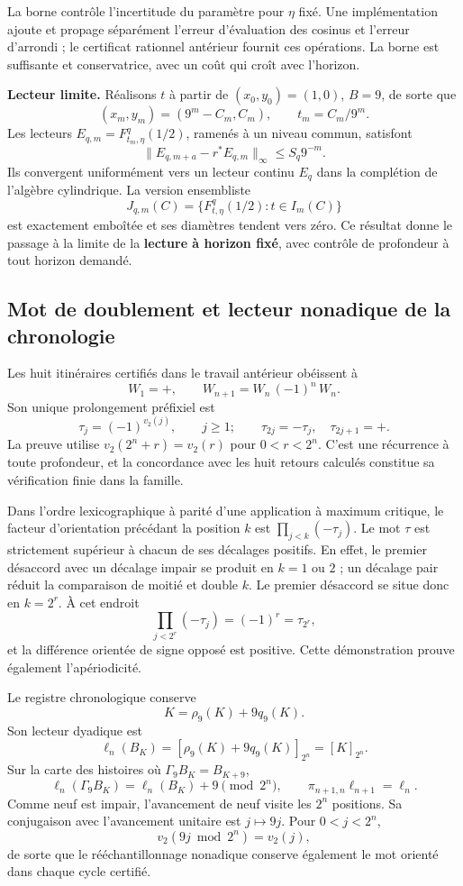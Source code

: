 La borne contrôle l’incertitude du paramètre pour \(\eta\) fixé. Une implémentation ajoute et propage séparément l’erreur d’évaluation des cosinus et l’erreur d’arrondi ; le certificat rationnel antérieur fournit ces opérations. La borne est suffisante et conservatrice, avec un coût qui croît avec l’horizon.

\textbf{Lecteur limite.} Réalisons \(t\) à partir de \((x_0,y_0)=(1,0)\), \(B=9\), de sorte que
\[
(x_m,y_m)=(9^m-C_m,C_m),\qquad t_m=C_m/9^m.
\]
Les lecteurs \(E_{q,m}=F_{t_m,\eta}^{q}(1/2)\), ramenés à un niveau commun, satisfont
\[
\|E_{q,m+a}-r^*E_{q,m}\|_\infty\le S_q9^{-m}.
\]
Ils convergent uniformément vers un lecteur continu \(E_q\) dans la complétion de l’algèbre cylindrique. La version ensembliste
\[
J_{q,m}(C)=\{F_{t,\eta}^{q}(1/2):t\in I_m(C)\}
\]
est exactement emboîtée et ses diamètres tendent vers zéro. Ce résultat donne le passage à la limite de la \textbf{lecture à horizon fixé}, avec contrôle de profondeur à tout horizon demandé.


\subsection{Mot de doublement et lecteur nonadique de la chronologie}
\label{hmtfg:prolongacion:4}

Les huit itinéraires certifiés dans le travail antérieur obéissent à
\[
W_1=+,\qquad W_{n+1}=W_n\,(-1)^n\,W_n.
\]
Son unique prolongement préfixiel est
\[
\tau_j=(-1)^{v_2(j)},\qquad j\ge1;
\qquad \tau_{2j}=-\tau_j,\quad\tau_{2j+1}=+.
\]
La preuve utilise \(v_2(2^n+r)=v_2(r)\) pour \(0<r<2^n\). C’est une récurrence à toute profondeur, et la concordance avec les huit retours calculés constitue sa vérification finie dans la famille.

Dans l’ordre lexicographique à parité d’une application à maximum critique, le facteur d’orientation précédant la position \(k\) est \(\prod_{j<k}(-\tau_j)\). Le mot \(\tau\) est strictement supérieur à chacun de ses décalages positifs. En effet, le premier désaccord avec un décalage impair se produit en \(k=1\) ou \(2\) ; un décalage pair réduit la comparaison de moitié et double \(k\). Le premier désaccord se situe donc en \(k=2^r\). À cet endroit
\[
\prod_{j<2^r}(-\tau_j)=(-1)^r=\tau_{2^r},
\]
et la différence orientée de signe opposé est positive. Cette démonstration prouve également l’apériodicité.

Le registre chronologique conserve
\[
K=\rho_9(K)+9q_9(K).
\]
Son lecteur dyadique est
\[
\ell_n(B_K)=[\rho_9(K)+9q_9(K)]_{2^n}=[K]_{2^n}.
\]
Sur la carte des histoires où \(\Gamma_9 B_K=B_{K+9}\),
\[
\ell_n(\Gamma_9B_K)=\ell_n(B_K)+9\pmod{2^n},\qquad
\pi_{n+1,n}\ell_{n+1}=\ell_n.
\]
Comme neuf est impair, l’avancement de neuf visite les \(2^n\) positions. Sa conjugaison avec l’avancement unitaire est \(j\mapsto9j\). Pour \(0<j<2^n\),
\[
v_2(9j\bmod2^n)=v_2(j),
\]
de sorte que le rééchantillonnage nonadique conserve également le mot orienté dans chaque cycle certifié.


